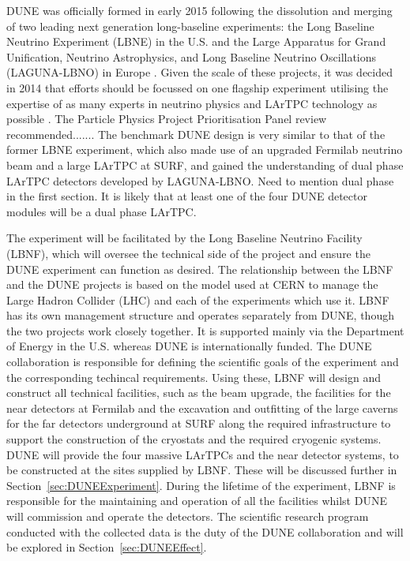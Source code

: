 DUNE was officially formed in early 2015 following the dissolution and merging of two leading next generation long-baseline experiments: the Long Baseline Neutrino Experiment (LBNE) in the U.S. \cite{LBNECDR1,LBNECDR3,LBNECDR4a} and the Large Apparatus for Grand Unification, Neutrino Astrophysics, and Long Baseline Neutrino Oscillations (LAGUNA-LBNO) in Europe \cite{LAGUNA-LBNO2015}.  Given the scale of these projects, it was decided in 2014 that efforts should be focussed on one flagship experiment utilising the expertise of as many experts in neutrino physics and LArTPC technology as possible \cite{P52014}.  The Particle Physics Project Prioritisation Panel review recommended.......  The benchmark DUNE design is very similar to that of the former LBNE experiment, which also made use of an upgraded Fermilab neutrino beam and a large LArTPC at SURF, and gained the understanding of dual phase LArTPC detectors developed by LAGUNA-LBNO. {\color{red} Need to mention dual phase in the first section.}  It is likely that at least one of the four DUNE detector modules will be a dual phase LArTPC.

The experiment will be facilitated by the Long Baseline Neutrino Facility (LBNF), which will oversee the technical side of the project and ensure the DUNE experiment can function as desired.  The relationship between the LBNF and the DUNE projects is based on the model used at CERN to manage the Large Hadron Collider (LHC) and each of the experiments which use it.  LBNF has its own management structure and operates separately from DUNE, though the two projects work closely together.  It is supported mainly via the Department of Energy in the U.S. whereas DUNE is internationally funded.  The DUNE collaboration is responsible for defining the scientific goals of the experiment and the corresponding techincal requirements.  Using these, LBNF will design and construct all technical facilities, such as the beam upgrade, the facilities for the near detectors at Fermilab and the excavation and outfitting of the large caverns for the far detectors underground at SURF along the required infrastructure to support the construction of the cryostats and the required cryogenic systems.  DUNE will provide the four massive LArTPCs and the near detector systems, to be constructed at the sites supplied by LBNF.  These will be discussed further in Section~\ref{sec:DUNEExperiment}.  During the lifetime of the experiment, LBNF is responsible for the maintaining and operation of all the facilities whilst DUNE will commission and operate the detectors.  The scientific research program conducted with the collected data is the duty of the DUNE collaboration and will be explored in Section~\ref{sec:DUNEEffect}.

